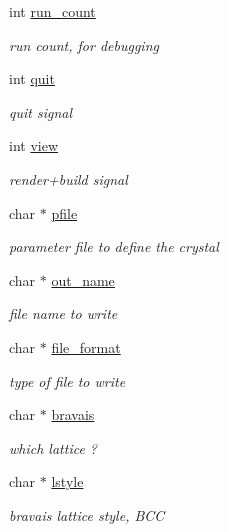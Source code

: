 \begin{DoxyCompactItemize}
int \hyperlink{class_reader_a7915928dbe39a87fe9d7ef829f848acb}{run\+\_\+count}
\begin{DoxyCompactList}\small\item\em run count, for debugging \end{DoxyCompactList}\item 
int \hyperlink{class_reader_ada4132c63c686a21ea6eb8f05d724edc}{quit}
\begin{DoxyCompactList}\small\item\em quit signal \end{DoxyCompactList}\item 
int \hyperlink{class_reader_a4686a622a101960a17a1786a45b84bcd}{view}
\begin{DoxyCompactList}\small\item\em render+build signal \end{DoxyCompactList}\item 
char $\ast$ \hyperlink{class_reader_a2aa3818b76e5565fef7e72a5018ca084}{pfile}
\begin{DoxyCompactList}\small\item\em parameter file to define the crystal \end{DoxyCompactList}\item 
char $\ast$ \hyperlink{class_reader_a05d97010d814f91cffe66657e2c39ffd}{out\+\_\+name}
\begin{DoxyCompactList}\small\item\em file name to write \end{DoxyCompactList}\item 
char $\ast$ \hyperlink{class_reader_a8031979223c6835ee2a52be58c13f9b1}{file\+\_\+format}
\begin{DoxyCompactList}\small\item\em type of file to write \end{DoxyCompactList}\item 
char $\ast$ \hyperlink{class_reader_a9aa6c187535ed940397c836aacfcc0c1}{bravais}
\begin{DoxyCompactList}\small\item\em which lattice ? \end{DoxyCompactList}\item 
char $\ast$ \hyperlink{class_reader_aaaa3ec196647f9d79f39fac3db21d288}{lstyle}
\begin{DoxyCompactList}\small\item\em bravais lattice style, B\+C\+C \end{DoxyCompactList}\item 

\end{DoxyCompactItemize}
